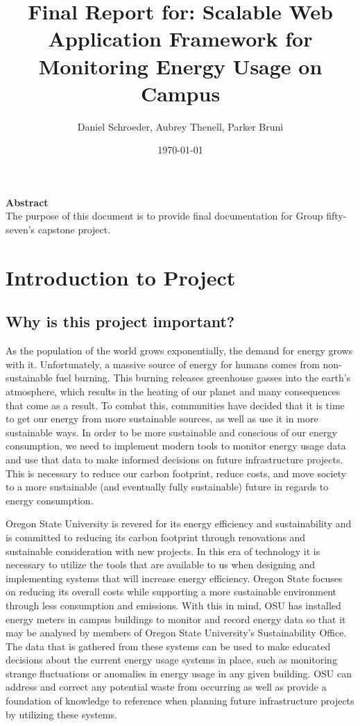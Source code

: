 \documentclass[journal,10pt,onecolumn,compsoc]{IEEEtran}
\title{Final Report for: \linebreak Scalable Web Application Framework for Monitoring Energy Usage on Campus}
\author{Daniel Schroeder, Aubrey Thenell, Parker Bruni}
\date{\today}
\begin{document}
    \maketitle
    \vspace{2cm}
    \begin{center}
    \noindent \textbf{Abstract} \\
                \indent The purpose of this document is to provide final documentation for Group fifty-seven's capstone project. 
    \end{center}         
    
    \newpage
    \tableofcontents
        
    \section{Introduction to Project}  
    \subsection{Why is this project important?}
    \indent As the population of the world grows exponentially, the demand for energy grows with it. Unfortunately, a massive source of energy for humans comes from non-sustainable fuel burning. This burning releases greenhouse gasses into the earth’s atmosphere, which results in the heating of our planet and many consequences that come as a result. To combat this, communities have decided that it is time to get our energy from more sustainable sources, as well as use it in more sustainable ways. In order to be more sustainable and conscious of our energy consumption, we need to implement modern tools to monitor energy usage data and use that data to make informed decisions on future infrastructure projects. This is necessary to reduce our carbon footprint, reduce costs, and move society to a more sustainable (and eventually fully sustainable) future in regards to energy consumption.

    \indent Oregon State University is revered for its energy efficiency and sustainability and is committed to reducing its carbon footprint through renovations and sustainable consideration with new projects. In this era of technology it is necessary to utilize the tools that are available to us when designing and implementing systems that will increase energy efficiency. Oregon State focuses on reducing its overall costs while supporting a more sustainable environment through less consumption and emissions. With this in mind, OSU has installed energy meters in campus buildings to monitor and record energy data so that it may be analysed by members of Oregon State University’s Sustainability Office. The data that is gathered from these systems can be used to make educated decisions about the current energy usage systems in place, such as monitoring strange fluctuations or anomalies in energy usage in any given building. OSU can address and correct any potential waste from occurring as well as provide a foundation of knowledge to reference when planning future infrastructure projects by utilizing these systems.
\end{document}
